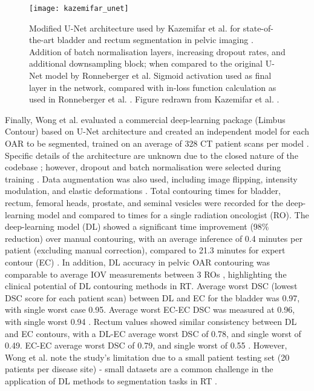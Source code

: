 \begin{figure}
	\begin{center}
		\texttt{[image: kazemifar\_unet]}
		\caption{Modified U-Net architecture used by Kazemifar et al. for state-of-the-art bladder and rectum segmentation in pelvic imaging \cite{Kazemifar_2018}. Addition of batch normalisation layers, increasing dropout rates, and additional downsampling block; when compared to the original U-Net model by Ronneberger et al. Sigmoid activation used as final layer in the network, compared with in-loss function calculation as used in Ronneberger et al. \cite{Ronneberger_2015}. Figure redrawn from Kazemifar et al. \cite{Kazemifar_2018}.}
		\label{fig:kazemifar_unet}
	\end{center}
\end{figure}

Finally, Wong et al. evaluated a commercial deep-learning package (Limbus Contour) based on U-Net architecture and created an independent model for each OAR to be segmented, trained on an average of 328 CT patient scans per model \cite{Wong2020}. Specific details of the architecture are unknown due to the closed nature of the codebase \cite{Wong2020}; however, dropout and batch normalisation were selected during training \cite{Wong2020}. Data augmentation was also used, including image flipping, intensity modulation, and elastic deformations \cite{Wong2020}. Total contouring times for bladder, rectum, femoral heads, prostate, and seminal vesicles were recorded for the deep-learning model and compared to times for a single radiation oncologist (RO). The deep-learning model (DL) showed a significant time improvement (98\% reduction) over manual contouring, with an average inference of 0.4 minutes per patient (excluding manual correction), compared to 21.3 minutes for expert contour (EC) \cite{Wong2020}. In addition, DL accuracy in pelvic OAR contouring was comparable to average IOV measurements between 3 ROs \cite{Wong2020}, highlighting the clinical potential of DL contouring methods in RT. Average worst DSC (lowest DSC score for each patient scan) between DL and EC for the bladder was 0.97, with single worst case 0.95. Average worst EC-EC DSC was measured at 0.96, with single worst 0.94 \cite{Wong2020}. Rectum values showed similar consistency between DL and EC contours, with a DL-EC average worst DSC of 0.78, and single worst of 0.49. EC-EC average worst DSC of 0.79, and single worst of 0.55 \cite{Wong2020}. However, Wong et al. note the study's limitation due to a small patient testing set (20 patients per disease site) \cite{Wong2020} - small datasets are a common challenge in the application of DL methods to segmentation tasks in RT \cite{Ronneberger_2015, Maier2019, Hesamian2019, Lundervold2019}.
%
